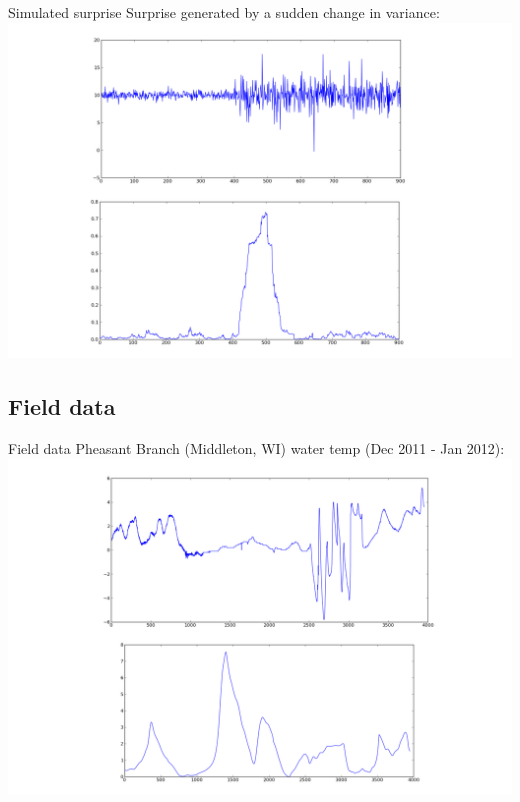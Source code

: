 \documentclass{beamer}
\begin{document}
\begin{frame}{Simulated surprise}
	Surprise generated by a sudden change in variance:
	\includegraphics[width=\textwidth]{../../figures/mock3}
\end{frame}



\subsection{Field data}


\begin{frame}{Field data}
	Pheasant Branch (Middleton, WI) water temp (Dec 2011 - Jan 2012):
	\includegraphics[width=\textwidth]{../../figures/pheasantbranch}
\end{frame}
\end{document}
